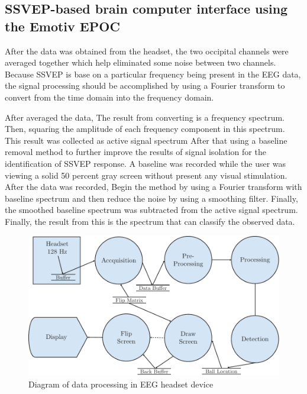 \subsection {SSVEP-based brain computer interface using the Emotiv EPOC\cite{ref6}}

\hspace{1.5cm} After the data was obtained from the headset, the two occipital channels were averaged together which help eliminated some noise between two channels. Because SSVEP is base on a particular frequency being present in the EEG data, the signal processing should be accomplished by using a Fourier transform to convert from the time domain into the frequency domain. \par After averaged the data, The result from converting is a frequency spectrum. Then, squaring the amplitude of each frequency component in this spectrum. This result was collected as active signal spectrum After that using a baseline removal method to further improve the results of signal isolation for the identification of SSVEP response. A baseline was recorded while the user was viewing a solid 50 percent gray screen without present any visual stimulation. After the data was recorded, Begin the method by using a Fourier transform with baseline spectrum and then reduce the noise by using a smoothing filter. Finally, the smoothed baseline spectrum was subtracted from the active signal spectrum. Finally, the result from this is the spectrum that can classify the observed data.\\ 

\begin{figure}[ht]
	\centering
	\includegraphics[scale = 0.8]{chapter2/29.pdf}
	\caption{Diagram of data processing in EEG headset device \cite{ref6}}
\end{figure}

